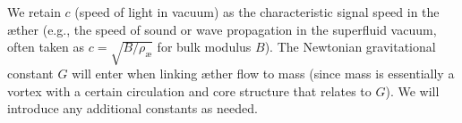 We retain $c$ (speed of light in vacuum) as the characteristic signal speed in the æther (e.g., the speed of sound or wave propagation in the superfluid vacuum, often taken as $c = \sqrt{B/\rho_{\text{\ae}}}$ for bulk modulus $B$). The Newtonian gravitational constant $G$ will enter when linking æther flow to mass (since mass is essentially a vortex with a certain circulation and core structure that relates to $G$). We will introduce any additional constants as needed.